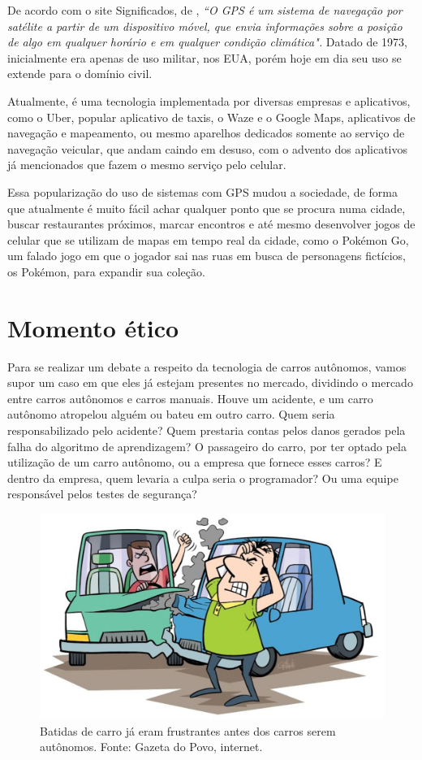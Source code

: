 \documentclass[12pt]{article}
\begin{document}
		De acordo com o site Significados, de \citet{guimaraes_significado_nodate}, \emph{``O GPS é um sistema de navegação por satélite a partir de um dispositivo móvel, que envia informações sobre a posição de algo em qualquer horário e em qualquer condição climática".} Datado de 1973, inicialmente era apenas de uso militar, nos EUA, porém hoje em dia seu uso se extende para o domínio civil.
		
		Atualmente, é uma tecnologia implementada por diversas empresas e aplicativos, como o Uber, popular aplicativo de taxis, o Waze e o Google Maps, aplicativos de navegação e mapeamento, ou mesmo aparelhos dedicados somente ao serviço de navegação veicular, que andam caindo em desuso, com o advento dos aplicativos já mencionados que fazem o mesmo serviço pelo celular.
		
		Essa popularização do uso de sistemas com GPS mudou a sociedade, de forma que atualmente é muito fácil achar qualquer ponto que se procura numa cidade, buscar restaurantes próximos, marcar encontros e até mesmo desenvolver jogos de celular que se utilizam de mapas em tempo real da cidade, como o Pokémon Go, um falado jogo em que o jogador sai nas ruas em busca de personagens fictícios, os Pokémon, para expandir sua coleção.
		
	\section{\label{etico}Momento ético}
	
		Para se realizar um debate a respeito da tecnologia de carros autônomos, vamos supor um caso em que eles já estejam presentes no mercado, dividindo o mercado entre carros autônomos e carros manuais. Houve um acidente, e um carro autônomo atropelou alguém ou bateu em outro carro. Quem seria responsabilizado pelo acidente? Quem prestaria contas pelos danos gerados pela falha do algoritmo de aprendizagem? O passageiro do carro, por ter optado pela utilização de um carro autônomo, ou a empresa que fornece esses carros? E dentro da empresa, quem levaria a culpa seria o programador? Ou uma equipe responsável pelos testes de segurança?
		
		\begin{figure}[ht]
			\centering
			\includegraphics[width=.8\textwidth]{carro-batida.jpg}
			\caption{Batidas de carro já eram frustrantes antes dos carros serem autônomos. Fonte: Gazeta do Povo, internet. }\label{fig:2}
		\end{figure}
		
\end{document}
